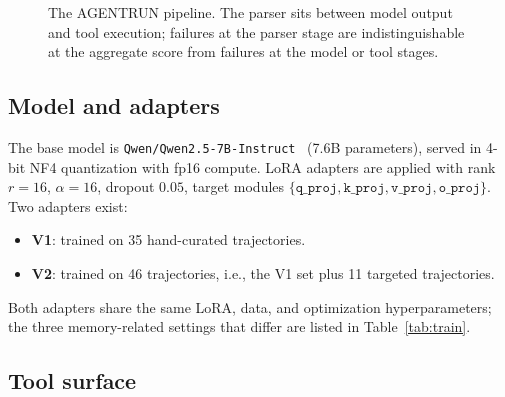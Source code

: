 \documentclass[10pt,twocolumn]{article}
\newcommand{\code}[1]{\texttt{#1}}
\begin{document}
\begin{figure}[t]
\centering
{}
\caption{The AGENTRUN pipeline. The parser sits between model output and tool execution; failures at the parser stage are indistinguishable at the aggregate score from failures at the model or tool stages.}
\label{fig:pipeline}
\end{figure}

\subsection{Model and adapters}

The base model is \code{Qwen/Qwen2.5-7B-Instruct}~\citep{qwen2024qwen} (7.6B parameters), served in 4-bit NF4 quantization with fp16 compute. LoRA adapters are applied with rank $r=16$, $\alpha=16$, dropout $0.05$, target modules $\{\code{q\_proj}, \code{k\_proj}, \code{v\_proj}, \code{o\_proj}\}$. Two adapters exist:
\begin{itemize}\itemsep2pt
\item \textbf{V1}: trained on 35 hand-curated trajectories.
\item \textbf{V2}: trained on 46 trajectories, i.e., the V1 set plus 11 targeted trajectories.
\end{itemize}
Both adapters share the same LoRA, data, and optimization hyperparameters; the
three memory-related settings that differ are listed in Table~\ref{tab:train}.

\subsection{Tool surface}
\end{document}
